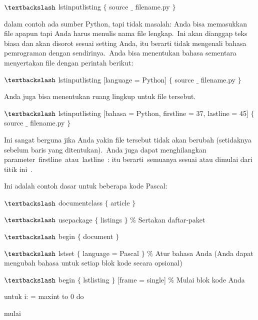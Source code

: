 $\textbackslash$ lstinputlisting $ \{ $ source $ \_ $ filename.py $ \} $\par

dalam contoh ada sumber Python, tapi tidak masalah: Anda bisa memasukkan file apapun tapi Anda harus menulis nama file lengkap. Ini akan dianggap teks biasa dan akan disorot sesuai setting Anda, itu berarti tidak mengenali bahasa pemrograman dengan sendirinya. Anda bisa menentukan bahasa sementara menyertakan file dengan perintah berikut:\par

$\textbackslash$ lstinputlisting [language = Python] $ \{ $ source $ \_ $ filename.py $ \} $\par

Anda juga bisa menentukan ruang lingkup untuk file tersebut.\par

$\textbackslash$ lstinputlisting [bahasa = Python, firstline = 37, lastline = 45] $ \{ $ source $ \_ $ filename.py $ \} $\par

Ini sangat berguna jika Anda yakin file tersebut tidak akan berubah (setidaknya sebelum baris yang ditentukan). Anda juga dapat menghilangkan parameter firstline atau lastline : itu berarti semuanya sesuai atau dimulai dari titik ini .\par

Ini adalah contoh dasar untuk beberapa kode Pascal:\par

 $\textbackslash$ documentclass $ \{ $ article $ \} $\par

 $\textbackslash$ usepackage $ \{ $ listings $ \} $ $\%$ Sertakan daftar-paket\par

 $\textbackslash$ begin $ \{ $ document $ \} $\par

 $\textbackslash$ lstset $ \{ $ language = Pascal $ \} $ $\%$ Atur bahasa Anda (Anda dapat mengubah bahasa untuk setiap blok kode secara opsional)\par

 $\textbackslash$ begin $ \{ $ lstlisting $ \} $ [frame = single] $\%$ Mulai blok kode Anda\par

 untuk i: = maxint to 0 do\par

 mulai\par


